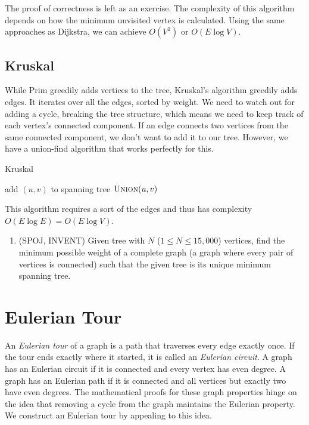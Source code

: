 \documentclass[11pt]{book}
\begin{document}
The proof of correctness is left as an exercise. The complexity of this algorithm depends on how the minimum unvisited vertex is calculated. Using the same approaches as Dijkstra, we can achieve $O(V^2)$ or $O(E \log{V})$.

\subsection{Kruskal}

While Prim greedily adds vertices to the tree, Kruskal's algorithm greedily adds edges. It iterates over all the edges, sorted by weight. We need to watch out for adding a cycle, breaking the tree structure, which means we need to keep track of each vertex's connected component. If an edge connects two vertices from the same connected component, we don't want to add it to our tree. However, we have a union-find algorithm that works perfectly for this.

\begin{algorithm}[H]
\caption{Kruskal}
\begin{algorithmic}
		\State add $(u,v)$ to spanning tree
		\State $\Call{Union}{u,v}$
	\EndIf
\EndFor
\end{algorithmic}
\end{algorithm}

This algorithm requires a sort of the edges and thus has complexity $O(E \log{E}) = O(E \log{V})$.

\begin{enumerate}
\item
(SPOJ, INVENT)
Given tree with $N$ ($1 \le N \le 15,000$) vertices, find the minimum possible weight of a complete
graph (a graph where every pair of vertices is connected) such that the given tree is its unique minimum spanning
tree.
\end{enumerate}

\section{Eulerian Tour}

An \textit{Eulerian tour} of a graph is a path that traverses every edge exactly once. If the tour ends exactly where it started, it is called an \textit{Eulerian circuit}. A graph has an Eulerian circuit if it is connected and every vertex has even degree. A graph has an Eulerian path if it is connected and all vertices but exactly two have even degrees. The mathematical proofs for these graph properties hinge on the idea that removing a cycle from the graph maintains the Eulerian property. We construct an Eulerian tour by appealing to this idea.
\end{document}
